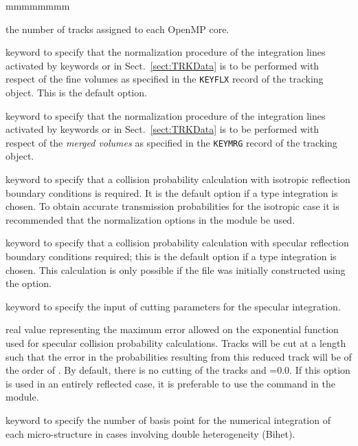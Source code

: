 \begin{ListeDeDescription}{mmmmmmmm}
\item[\dusa{nbatch}] the number of tracks assigned to each OpenMP core.

\item[\moc{TREG}] keyword to specify that the normalization procedure of the integration lines activated by keywords 
or  in Sect.~\ref{sect:TRKData} is to be performed with respect of the fine volumes as specified in the {\tt KEYFLX} record
of the tracking object. This is the default option.

\item[\moc{TMER}] keyword to specify that the normalization procedure of the integration lines activated by keywords 
or  in Sect.~\ref{sect:TRKData} is to be performed with respect of the {\sl merged volumes} as specified in the {\tt KEYMRG} record
of the tracking object.

\item[\moc{PISO}] keyword to specify that a collision probability calculation
with isotropic reflection boundary conditions is required. It is the default
option if a  type integration is chosen. To obtain accurate
transmission probabilities for the isotropic case it is recommended that the
normalization options in the  module be used.

\item[\moc{PSPC}] keyword to specify that  a collision probability calculation
with specular reflection boundary conditions required; this is the default
option if a  type integration is chosen. This calculation is only
possible if the file was initially constructed using the  option. 

\item[\moc{CUT}] keyword to specify the input of cutting parameters for the
specular integration.

\item[\dusa{pcut}] real value representing the maximum error allowed on the
exponential function used for specular collision probability calculations.
Tracks will be cut at a length such that the error in the probabilities
resulting from this reduced track will be of the order of . By
default, there is no cutting of the tracks and =0.0. If this option
is used in an entirely reflected case, it is preferable to use the 
command in the  module.

\item[\moc{QUAB}] keyword to specify the number of basis point for the
numerical integration of each micro-structure in cases involving double
heterogeneity (Bihet).


\end{ListeDeDescription}
